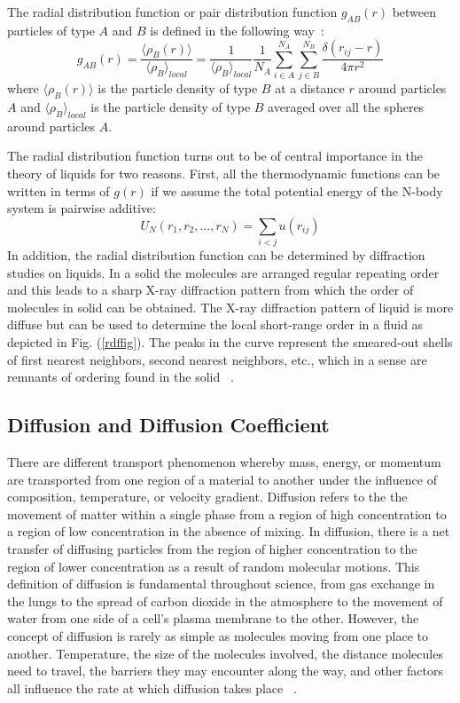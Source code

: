   The radial distribution function or pair distribution function $g_{AB}(r)$ between particles of type $A$ and $B$ is defined in the following way~\citep{Gromacs-manual}: 
  \begin{equation}
  g_{AB}(r) = \frac{\langle \rho_B (r) \rangle}{\langle \rho_B \rangle_{local}} = \frac{1}{\langle \rho_B \rangle_{local}} \frac{1}{N_A}  \sum_{i\in A}^{N_A} \sum_{j\in B}^{N_B} \frac{\delta(r_{ij}-r)}{4\pi r^2}
   \end{equation}
   where $\langle \rho_B (r) \rangle$ is the particle density of type $B$ at a distance $r$ around particles $A$ and  $\langle \rho_B \rangle_{local}$ is the particle density of type $B$ averaged over all the spheres around particles $A$.
   
   The radial distribution function turns out to be of central importance in the theory of liquids for two reasons. First, all the thermodynamic functions can be written in terms of $g(r)$ if we assume the total potential energy of the N-body system is pairwise additive: 
   \begin{equation}
  U_N(r_1, r_2, ..., r_N) = \sum_{i<j} u(r_{ij})
  \end{equation}
  In addition, the radial distribution function can be determined by diffraction studies on liquids. In a solid the molecules are arranged regular repeating order and this leads to a sharp X-ray diffraction pattern from which the order of molecules in solid can be obtained. The X-ray diffraction pattern of liquid is more diffuse but can be used to determine the local short-range order in a fluid as depicted in Fig. (\ref{rdffig}). The peaks in the curve represent the smeared-out shells of first nearest neighbors, second nearest neighbors, etc., which in a sense are remnants of ordering found in the solid ~\citep{chandler1987, mcquarrie2000}. 
    \subsection{Diffusion and Diffusion Coefficient}
     There are  different transport phenomenon whereby mass, energy, or momentum are transported from one region of a material to  another under the influence of composition, temperature, or velocity gradient. Diffusion refers to the the movement of matter within a single phase from a region of high concentration to a region of low concentration in the absence of mixing. In diffusion, there
   is a net transfer of diffusing particles from the region of higher concentration to the region of lower concentration as a result of random molecular motions. This definition of diffusion is fundamental throughout science, from gas exchange in the lungs to the spread of carbon dioxide in the atmosphere to the movement of water from one side of a cell's plasma membrane to the other. However, the concept of diffusion is rarely as simple as molecules moving from one place to another. Temperature, the size of the molecules involved, the distance molecules need to travel, the barriers they may encounter along the way, and other factors all influence the rate at which diffusion takes place ~\citep{cussler2009}. 
   
